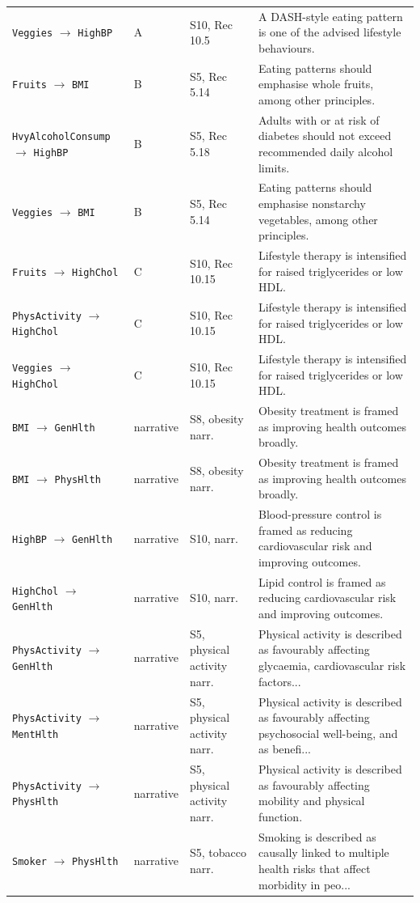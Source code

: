 \documentclass[conference]{IEEEtran}
\begin{document}
\begin{table}[t]
\begin{tabular}{@{}lllp{9.2cm}@{}}
\texttt{Veggies} $\rightarrow$ \texttt{HighBP} & A & S10, Rec 10.5 & A DASH-style eating pattern is one of the advised lifestyle behaviours. \\
\texttt{Fruits} $\rightarrow$ \texttt{BMI} & B & S5, Rec 5.14 & Eating patterns should emphasise whole fruits, among other principles. \\
\texttt{HvyAlcoholConsump} $\rightarrow$ \texttt{HighBP} & B & S5, Rec 5.18 & Adults with or at risk of diabetes should not exceed recommended daily alcohol limits. \\
\texttt{Veggies} $\rightarrow$ \texttt{BMI} & B & S5, Rec 5.14 & Eating patterns should emphasise nonstarchy vegetables, among other principles. \\
\texttt{Fruits} $\rightarrow$ \texttt{HighChol} & C & S10, Rec 10.15 & Lifestyle therapy is intensified for raised triglycerides or low HDL. \\
\texttt{PhysActivity} $\rightarrow$ \texttt{HighChol} & C & S10, Rec 10.15 & Lifestyle therapy is intensified for raised triglycerides or low HDL. \\
\texttt{Veggies} $\rightarrow$ \texttt{HighChol} & C & S10, Rec 10.15 & Lifestyle therapy is intensified for raised triglycerides or low HDL. \\
\texttt{BMI} $\rightarrow$ \texttt{GenHlth} & narrative & S8, obesity narr. & Obesity treatment is framed as improving health outcomes broadly. \\
\texttt{BMI} $\rightarrow$ \texttt{PhysHlth} & narrative & S8, obesity narr. & Obesity treatment is framed as improving health outcomes broadly. \\
\texttt{HighBP} $\rightarrow$ \texttt{GenHlth} & narrative & S10, narr. & Blood-pressure control is framed as reducing cardiovascular risk and improving outcomes. \\
\texttt{HighChol} $\rightarrow$ \texttt{GenHlth} & narrative & S10, narr. & Lipid control is framed as reducing cardiovascular risk and improving outcomes. \\
\texttt{PhysActivity} $\rightarrow$ \texttt{GenHlth} & narrative & S5, physical activity narr. & Physical activity is described as favourably affecting glycaemia, cardiovascular risk factors... \\
\texttt{PhysActivity} $\rightarrow$ \texttt{MentHlth} & narrative & S5, physical activity narr. & Physical activity is described as favourably affecting psychosocial well-being, and as benefi... \\
\texttt{PhysActivity} $\rightarrow$ \texttt{PhysHlth} & narrative & S5, physical activity narr. & Physical activity is described as favourably affecting mobility and physical function. \\
\texttt{Smoker} $\rightarrow$ \texttt{PhysHlth} & narrative & S5, tobacco narr. & Smoking is described as causally linked to multiple health risks that affect morbidity in peo... \\
\bottomrule
\end{tabular}
\end{table}
\end{document}
